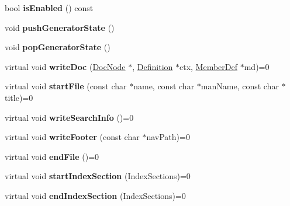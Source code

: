 \begin{DoxyCompactItemize}
bool {\bfseries is\+Enabled} () const
\item 
\mbox{\label{class_output_generator_a0e96bd0b61096478ec0eecfee3f609df}} 
void {\bfseries push\+Generator\+State} ()
\item 
\mbox{\label{class_output_generator_ae8e915381e39d9c92674d7cb0e0e6589}} 
void {\bfseries pop\+Generator\+State} ()
\item 
\mbox{\label{class_output_generator_ac0b25a3af7edb8a631f21f34184f9a97}} 
virtual void {\bfseries write\+Doc} (\mbox{\hyperlink{class_doc_node}{Doc\+Node}} $\ast$, \mbox{\hyperlink{class_definition}{Definition}} $\ast$ctx, \mbox{\hyperlink{class_member_def}{Member\+Def}} $\ast$md)=0
\item 
\mbox{\label{class_output_generator_a8c04cb480935a4f94b5391b97d01d5fb}} 
virtual void {\bfseries start\+File} (const char $\ast$name, const char $\ast$man\+Name, const char $\ast$title)=0
\item 
\mbox{\label{class_output_generator_a6f93852b3d43ab8a63be1e46f10eb8fd}} 
virtual void {\bfseries write\+Search\+Info} ()=0
\item 
\mbox{\label{class_output_generator_ac8f9e609b1f2633a07c5560cc1eb4dc9}} 
virtual void {\bfseries write\+Footer} (const char $\ast$nav\+Path)=0
\item 
\mbox{\label{class_output_generator_acdf48180d14b1d720286049195ad1c6a}} 
virtual void {\bfseries end\+File} ()=0
\item 
\mbox{\label{class_output_generator_ab8164b995688984ec7613485758a1af3}} 
virtual void {\bfseries start\+Index\+Section} (Index\+Sections)=0
\item 
\mbox{\label{class_output_generator_a04f3624f96d78d2cf07813e7ef759f3f}} 
virtual void {\bfseries end\+Index\+Section} (Index\+Sections)=0
\item 
\mbox{\label{class_output_generator_a92ddc60cab560b9e4a65bcd504cb779d}} 

\end{DoxyCompactItemize}
